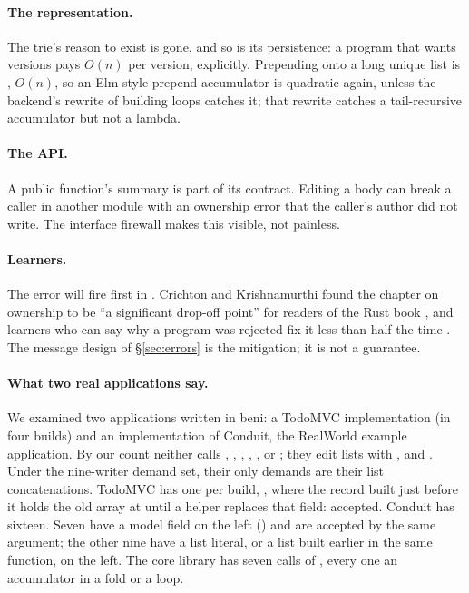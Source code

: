 \paragraph{The representation.} The trie's reason to exist is gone, and so is its persistence: a
program that wants versions pays $O(n)$ per version, explicitly. Prepending onto a long unique list is
, $O(n)$, so an Elm-style prepend accumulator is quadratic again, unless the backend's
rewrite of building loops catches it; that rewrite catches a tail-recursive accumulator but not a
 lambda.

\paragraph{The API.} A public function's summary is part of its contract. Editing a body can break a
caller in another module with an ownership error that the caller's author did not write. The interface
firewall makes this visible, not painless.

\paragraph{Learners.} The error will fire first in . Crichton and Krishnamurthi found the
chapter on ownership to be ``a significant drop-off point'' for readers of the Rust book
\citep[\S3.1]{crichton2024profiling}, and learners who can say why a program was rejected fix it less
than half the time \citep{crichton2023grounded}. The message design of \S\ref{sec:errors} is the
mitigation; it is not a guarantee.

\paragraph{What two real applications say.} We examined two applications written in beni: a TodoMVC
implementation (in four builds) and an implementation of Conduit, the RealWorld example application. By
our count neither calls , , , , ,  or
; they edit lists with ,  and \code{++}. Under the
nine-writer demand set, their only demands are their list concatenations. TodoMVC has one per build,
, where the record built just before it holds the old array at 
until a helper replaces that field: accepted. Conduit has sixteen. Seven have a model field on the left
() and are accepted by the same
argument; the other nine have a list literal, or a list built earlier in the same function, on the left.
The core library has seven calls of , every one an accumulator in a fold or a loop.


